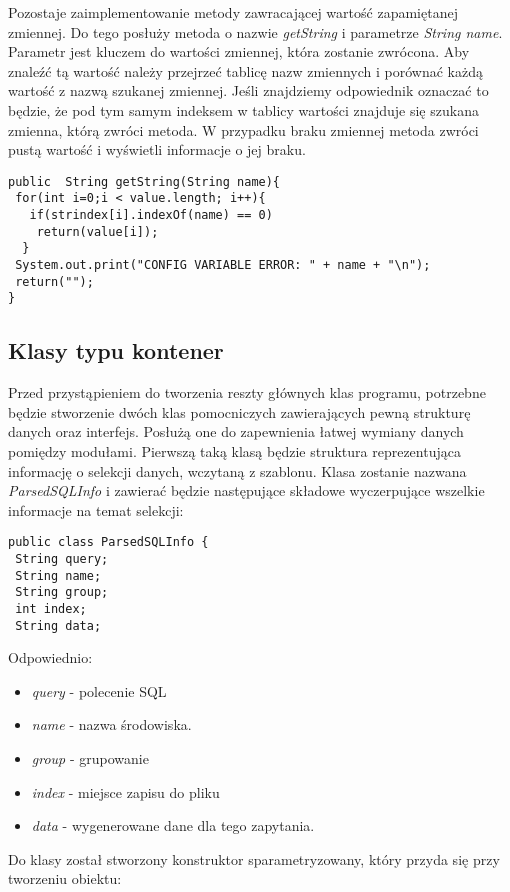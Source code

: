 Pozostaje zaimplementowanie metody zawracającej wartość zapamiętanej zmiennej. Do tego posłuży metoda o nazwie \emph{getString} i parametrze \emph{String name}. Parametr jest kluczem do wartości zmiennej, która zostanie zwrócona.  Aby znaleźć tą wartość należy przejrzeć tablicę nazw zmiennych i porównać każdą wartość z nazwą szukanej zmiennej. Jeśli znajdziemy odpowiednik oznaczać to będzie, że pod tym samym indeksem w tablicy wartości znajduje się szukana zmienna, którą zwróci metoda. W przypadku braku zmiennej metoda zwróci pustą wartość i wyświetli informacje o jej braku.

\begin{lstlisting}
public  String getString(String name){
 for(int i=0;i < value.length; i++){
   if(strindex[i].indexOf(name) == 0)
    return(value[i]);
  }
 System.out.print("CONFIG VARIABLE ERROR: " + name + "\n");
 return("");
}
\end{lstlisting}

\subsection{Klasy typu kontener}

Przed przystąpieniem do tworzenia reszty głównych klas programu, potrzebne będzie stworzenie dwóch klas pomocniczych zawierających pewną strukturę danych oraz interfejs. Posłużą one do zapewnienia łatwej wymiany danych pomiędzy modułami. Pierwszą taką klasą będzie struktura reprezentująca informację o selekcji danych, wczytaną z szablonu. Klasa zostanie nazwana \emph{ParsedSQLInfo} i zawierać będzie następujące składowe wyczerpujące wszelkie informacje na temat selekcji:

\begin{lstlisting}
public class ParsedSQLInfo {
 String query;
 String name;
 String group;
 int index;
 String data;
\end{lstlisting}
Odpowiednio:
    \begin{itemize}
    \item \emph{query} - polecenie SQL
    \item \emph{name} - nazwa środowiska.
    \item \emph{group} - grupowanie
    \item \emph{index} - miejsce zapisu do pliku
    \item \emph{data} - wygenerowane dane dla tego zapytania.
    \end{itemize}

Do klasy został stworzony konstruktor sparametryzowany, który przyda się przy tworzeniu obiektu:
   
